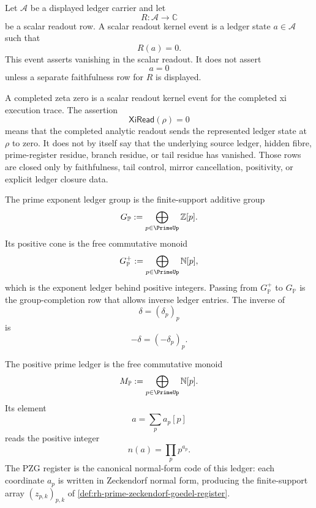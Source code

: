 \begin{definition}
\label{def:rh-scalar-readout-kernel-event}
Let $\mathcal A$ be a displayed ledger carrier and let
$$
R:\mathcal A\to\mathbb C
$$
be a scalar readout row.  A scalar readout kernel event is a ledger
state $a\in\mathcal A$ such that
$$
R(a)=0.
$$
This event asserts vanishing in the scalar readout.  It does not assert
$$
a=0
$$
unless a separate faithfulness row for $R$ is displayed.
\end{definition}

\begin{principle}
\label{prin:rh-zeros-readout-kernel-events}
A completed zeta zero is a scalar readout kernel event for the completed
xi execution trace.  The assertion
$$
\mathsf{XiRead}(\rho)=0
$$
means that the completed analytic readout sends the represented ledger
state at $\rho$ to zero.  It does not by itself say that the underlying
source ledger, hidden fibre, prime-register residue, branch residue, or
tail residue has vanished.  Those rows are closed only by faithfulness,
tail control, mirror cancellation, positivity, or explicit ledger
closure data.
\end{principle}

\begin{definition}
\label{def:rh-prime-exponent-ledger-group}
The prime exponent ledger group is the finite-support additive group
$$
G_{\mathbb P}:=\bigoplus_{p\in\PrimeUp}\mathbb Z[p].
$$
Its positive cone is the free commutative monoid
$$
G_{\mathbb P}^{+}:=\bigoplus_{p\in\PrimeUp}\mathbb N[p],
$$
which is the exponent ledger behind positive integers.  Passing from
$G_{\mathbb P}^{+}$ to $G_{\mathbb P}$ is the group-completion row that
allows inverse ledger entries.  The inverse of
$$
\delta=(\delta_p)_p
$$
is
$$
-\delta=(-\delta_p)_p.
$$
\end{definition}

\begin{definition}
\label{def:rh-positive-prime-ledger}
The positive prime ledger is the free commutative monoid
$$
M_{\mathbb P}:=\bigoplus_{p\in\PrimeUp}\mathbb N[p].
$$
Its element
$$
a=\sum_p a_p[p]
$$
reads the positive integer
$$
n(a)=\prod_p p^{a_p}.
$$
The PZG register is the canonical normal-form code of this ledger: each
coordinate $a_p$ is written in Zeckendorf normal form, producing the
finite-support array $(z_{p,k})_{p,k}$ of
\autoref{def:rh-prime-zeckendorf-goedel-register}.
\end{definition}

